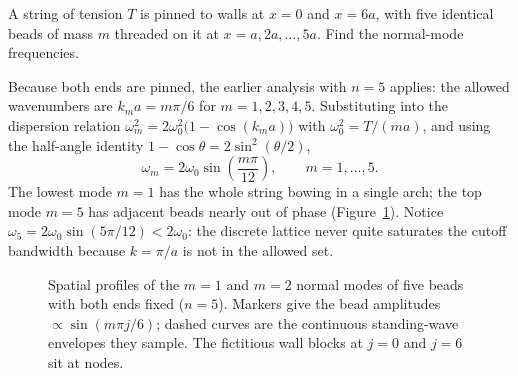 \begin{example}
A string of tension $T$ is pinned to walls at $x = 0$ and $x = 6a$, with five identical beads of mass $m$ threaded on it at $x = a, 2a, \ldots, 5a$. Find the normal-mode frequencies.

Because both ends are pinned, the earlier analysis with $n = 5$ applies: the allowed wavenumbers are $k_m a = m\pi/6$ for $m = 1, 2, 3, 4, 5$. Substituting into the dispersion relation $\omega_m^2 = 2\omega_0^2\bigl(1 - \cos(k_m a)\bigr)$ with $\omega_0^2 = T/(ma)$, and using the half-angle identity $1 - \cos\theta = 2\sin^2(\theta/2)$,
\begin{equation}
    \omega_m = 2\omega_0 \sin\!\left(\frac{m\pi}{12}\right), \qquad m = 1, \ldots, 5.
\end{equation}
The lowest mode $m = 1$ has the whole string bowing in a single arch; the top mode $m = 5$ has adjacent beads nearly out of phase (Figure~\ref{fig:mode-shapes}). Notice $\omega_5 = 2\omega_0 \sin(5\pi/12) < 2\omega_0$: the discrete lattice never quite saturates the cutoff bandwidth because $k = \pi/a$ is not in the allowed set.
\end{example}

\begin{figure}[H]
    \centering
    \caption{Spatial profiles of the $m = 1$ and $m = 2$ normal modes of five beads with both ends fixed ($n = 5$). Markers give the bead amplitudes $\propto \sin(m\pi j/6)$; dashed curves are the continuous standing-wave envelopes they sample. The fictitious wall blocks at $j = 0$ and $j = 6$ sit at nodes.}
    \label{fig:mode-shapes}
\end{figure}

